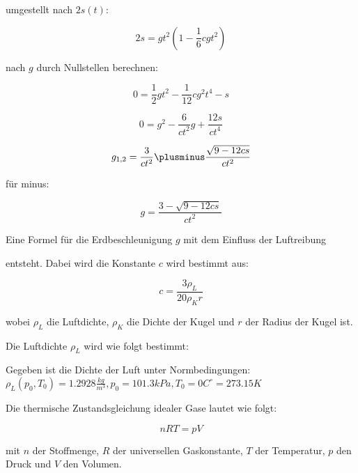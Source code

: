 \documentclass{protokoll}
\begin{document}
umgestellt nach $2s(t)$:


\begin{equation}
 2s = g t^2 (1 - \frac{1}{6} c g t^2) 
\end{equation}




nach $g$ durch Nullstellen berechnen:


\begin{equation}
 0 = \frac{1}{2} g t^2 - \frac{1}{12} c g^2 t^4 - s 
\end{equation}



\begin{equation}
 0 = g^2 - \frac{6}{ct^2} g + \frac{12s}{ct^4} 
\end{equation}



\begin{equation}
 g_{1,2} = \frac{3}{ct^2} \plusminus \frac{\sqrt{9 - 12cs}}{ct^2} 
\end{equation}




für minus:


\begin{equation}
 g = \frac{3 - \sqrt{9 - 12cs}}{ct^2} 
\end{equation}




Eine Formel für die Erdbeschleunigung $g$ mit dem Einfluss der Luftreibung 

entsteht. Dabei wird die Konstante $c$ wird bestimmt aus:


\begin{equation}
c = \frac{3 \rho_L}{20 \rho_K r}
\end{equation}




wobei $\rho_L$ die Luftdichte, $\rho_K$ die Dichte der Kugel 
und $r$ der Radius der Kugel ist.

Die Luftdichte $\rho_L$ wird wie folgt bestimmt:

Gegeben ist die Dichte der Luft unter Normbedingungen: 
$ \rho_L (p_0, T_0) = 1.2928 \frac{kg}{m^3}, p_0 = 101.3 kPa, 
T_0 = 0 C^\circ = 273.15 K$

Die thermische Zustandsgleichung idealer Gase lautet wie folgt:

\begin{equation}
nRT = pV
\end{equation}



mit $n$ der Stoffmenge, $R$ der universellen Gaskonstante, 
$T$ der Temperatur, $p$ den Druck und $V$ den Volumen.
\end{document}
